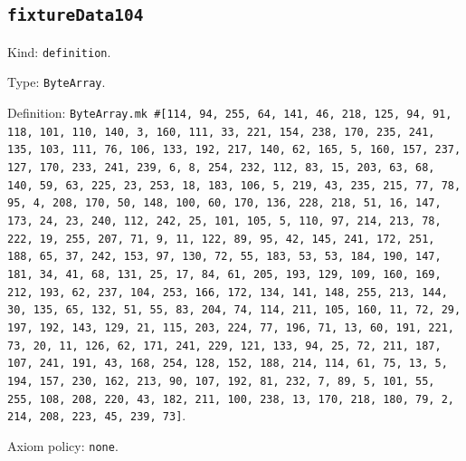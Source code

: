 \documentclass[11pt]{article}
\begin{document}
\subsection*{\texttt{fixtureData104}}
\noindent Kind: \texttt{definition}.\par
\noindent Type: \texttt{ByteArray}.\par
\noindent Definition: \texttt{ByteArray.mk \#[114, 94, 255, 64, 141, 46, 218, 125, 94, 91, 118, 101, 110, 140, 3, 160, 111, 33, 221, 154, 238, 170, 235, 241, 135, 103, 111, 76, 106, 133, 192, 217, 140, 62, 165, 5, 160, 157, 237, 127, 170, 233, 241, 239, 6, 8, 254, 232, 112, 83, 15, 203, 63, 68, 140, 59, 63, 225, 23, 253, 18, 183, 106, 5, 219, 43, 235, 215, 77, 78, 95, 4, 208, 170, 50, 148, 100, 60, 170, 136, 228, 218, 51, 16, 147, 173, 24, 23, 240, 112, 242, 25, 101, 105, 5, 110, 97, 214, 213, 78, 222, 19, 255, 207, 71, 9, 11, 122, 89, 95, 42, 145, 241, 172, 251, 188, 65, 37, 242, 153, 97, 130, 72, 55, 183, 53, 53, 184, 190, 147, 181, 34, 41, 68, 131, 25, 17, 84, 61, 205, 193, 129, 109, 160, 169, 212, 193, 62, 237, 104, 253, 166, 172, 134, 141, 148, 255, 213, 144, 30, 135, 65, 132, 51, 55, 83, 204, 74, 114, 211, 105, 160, 11, 72, 29, 197, 192, 143, 129, 21, 115, 203, 224, 77, 196, 71, 13, 60, 191, 221, 73, 20, 11, 126, 62, 171, 241, 229, 121, 133, 94, 25, 72, 211, 187, 107, 241, 191, 43, 168, 254, 128, 152, 188, 214, 114, 61, 75, 13, 5, 194, 157, 230, 162, 213, 90, 107, 192, 81, 232, 7, 89, 5, 101, 55, 255, 108, 208, 220, 43, 182, 211, 100, 238, 13, 170, 218, 180, 79, 2, 214, 208, 223, 45, 239, 73]}.\par
\noindent Axiom policy: \texttt{none}.\par
\end{document}
